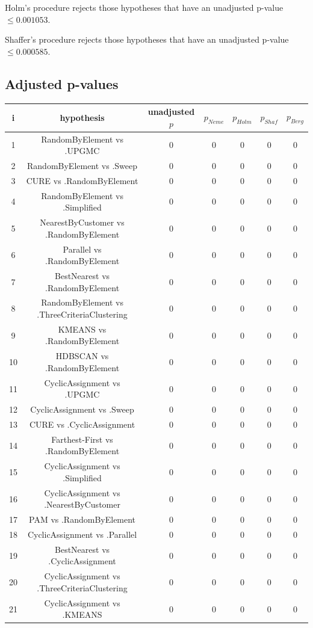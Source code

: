 \documentclass[a4paper,10pt]{article}
\begin{document}
\begin{landscape}
Holm's procedure rejects those hypotheses that have an unadjusted p-value $\le0.001053$.

Shaffer's procedure rejects those hypotheses that have an unadjusted p-value $\le0.000585$.

\pagebreak

\subsection{Adjusted p-values}

\begin{table}[!htp]
\centering\scriptsize
\begin{tabular}{ccccccc}
i&hypothesis&unadjusted $p$&$p_{Neme}$&$p_{Holm}$&$p_{Shaf}$&$p_{Berg}$\\
\hline1&RandomByElement vs .UPGMC&0&0&0&0&0\\
2&RandomByElement vs .Sweep&0&0&0&0&0\\
3&CURE vs .RandomByElement&0&0&0&0&0\\
4&RandomByElement vs .Simplified&0&0&0&0&0\\
5&NearestByCustomer vs .RandomByElement&0&0&0&0&0\\
6&Parallel vs .RandomByElement&0&0&0&0&0\\
7&BestNearest vs .RandomByElement&0&0&0&0&0\\
8&RandomByElement vs .ThreeCriteriaClustering&0&0&0&0&0\\
9&KMEANS vs .RandomByElement&0&0&0&0&0\\
10&HDBSCAN vs .RandomByElement&0&0&0&0&0\\
11&CyclicAssignment vs .UPGMC&0&0&0&0&0\\
12&CyclicAssignment vs .Sweep&0&0&0&0&0\\
13&CURE vs .CyclicAssignment&0&0&0&0&0\\
14&Farthest-First vs .RandomByElement&0&0&0&0&0\\
15&CyclicAssignment vs .Simplified&0&0&0&0&0\\
16&CyclicAssignment vs .NearestByCustomer&0&0&0&0&0\\
17&PAM vs .RandomByElement&0&0&0&0&0\\
18&CyclicAssignment vs .Parallel&0&0&0&0&0\\
19&BestNearest vs .CyclicAssignment&0&0&0&0&0\\
20&CyclicAssignment vs .ThreeCriteriaClustering&0&0&0&0&0\\
21&CyclicAssignment vs .KMEANS&0&0&0&0&0\\

\end{tabular}
\end{table}
\end{landscape}
\end{document}
